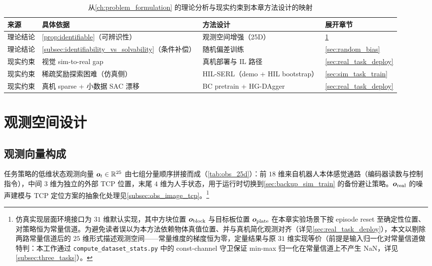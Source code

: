 \begin{table}[htbp]
  \centering
  \caption{从\cref{ch:problem_formulation} 的理论分析与现实约束到本章方法设计的映射}
  \label{tab:method_mapping}
  \footnotesize
  \begin{tabular}{@{}llll@{}}
    \toprule
    来源 & 具体依据 & 方法设计 & 展开章节 \\
    \midrule
    理论结论 & \cref{prop:identifiable}（可辨识性） & 观测空间增强（25D） & \cref{sec:obs_design} \\
    理论结论 & \cref{subsec:identifiability_vs_solvability}（条件补偿） & 随机偏差训练 & \cref{sec:random_bias} \\
    现实约束 & 视觉 sim-to-real gap & 真机部署与 IL 路径 & \cref{sec:real_task_deploy} \\
    现实约束 & 稀疏奖励探索困难（仿真侧） & HIL-SERL（demo + HIL bootstrap） & \cref{sec:sim_task_train} \\
    现实约束 & 真机 sparse + 小数据 SAC 漂移 & BC pretrain + HG-DAgger & \cref{sec:real_task_deploy} \\
    \bottomrule
  \end{tabular}
\end{table}

\section{观测空间设计}\label{sec:obs_design}

\subsection{观测向量构成}\label{subsec:obs_vector}

任务策略的低维状态观测向量 $\bm{o}_t \in \mathbb{R}^{25}$ 由七组分量顺序拼接而成（\cref{tab:obs_25d}）：前 $18$ 维来自机器人本体感觉通路（编码器读数与控制指令），中间 $3$ 维为独立的外部 TCP 位置，末尾 $4$ 维为人手状态，用于运行时切换到\cref{sec:backup_sim_train} 的备份避让策略。$\bm{o}_\text{real}$ 的噪声建模与 TCP 定位方案的抽象化处理见\cref{subsec:obs_image_tcp}。\footnote{仿真实现层面环境接口为 $31$ 维默认实现，其中方块位置 $\bm{o}_\text{block}$ 与目标板位置 $\bm{o}_\text{plate}$ 在本章实验场景下按 episode reset 至确定性位置、对策略恒为常量信道。为避免读者误以为本方法依赖物体真值位置、并与真机简化观测对齐（详见\cref{sec:real_task_deploy}），本文以剔除两路常量信道后的 $25$ 维形式描述观测空间——常量维度的梯度恒为零，定量结果与原 $31$ 维实现等价（前提是输入归一化对常量信道做特判：本工作通过 \texttt{compute\_dataset\_stats.py} 中的 const-channel 守卫保证 min-max 归一化在常量信道上不产生 NaN，详见\cref{subsec:three_tasks}）。}

